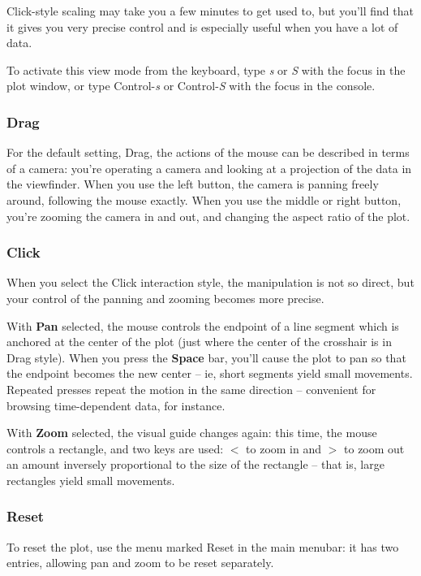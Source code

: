\documentclass[11pt]{article}
\begin{document}
Click-style scaling may take you a few minutes to get used to, but
you'll find that it gives you very precise control and is especially
useful when you have a lot of data.

To activate this view mode from the keyboard, type {\em s} or {\em S}
with the focus in the plot window, or type Control-{\em s} or
Control-{\em S} with the focus in the console.

\subsubsection{Drag}

For the default setting, Drag, the actions of the mouse can be
described in terms of a camera:  you're operating a camera and
looking at a projection of the data in the viewfinder.  When you use
the left button, the camera is panning freely around, following the
mouse exactly.  When you use the middle or right button, you're
zooming the camera in and out, and changing the aspect ratio of
the plot.

\subsubsection{Click}

When you select the Click interaction style, the manipulation is
not so direct, but your control of the panning and zooming becomes
more precise.

With {\bf Pan} selected, the mouse controls the endpoint of a line
segment which is anchored at the center of the plot (just where the
center of the crosshair is in Drag style).  When you press the {\bf
Space} bar, you'll cause the plot to pan so that the endpoint becomes
the new center -- ie, short segments yield small movements.  Repeated
presses repeat the motion in the same direction -- convenient for
browsing time-dependent data, for instance.

With {\bf Zoom} selected, the visual guide changes again: this time,
the mouse controls a rectangle, and two keys are used: {\boldmath $<$}
to zoom in and {\boldmath $>$} to zoom out an amount inversely
proportional to the size of the rectangle -- that is, large rectangles
yield small movements.

\subsubsection{Reset}

To reset the plot, use the menu marked Reset in the main menubar:
it has two entries, allowing pan and zoom to be reset separately.
\end{document}
